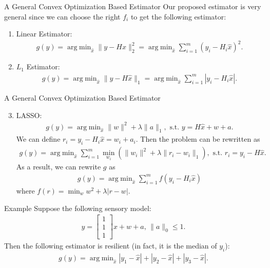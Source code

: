 \documentclass[10pt]{beamer}
\DeclareMathOperator{\argmin}{arg\;min}
\begin{document}
\begin{frame}{A General Convex Optimization Based Estimator}
  Our proposed estimator is very general since we can choose the right $f_i$ to get the following estimator:
  \begin{enumerate}
  \item Linear Estimator:
    \begin{align*}
      g(y) = \argmin_{\hat x} \|y-H\hat x\|_2^2= \argmin_{\hat x}  \sum_{i=1}^m (y_i-H_i\hat x)^2.
    \end{align*}
  \item $L_1$ Estimator:
    \begin{align*}
      g(y) = \argmin_{\hat x} \|y-H\hat x\|_1=\argmin_{\hat x} \sum_{i=1}^m |y_i-H_i\hat x|.
    \end{align*}
  \end{enumerate}
\end{frame}


\begin{frame}{A General Convex Optimization Based Estimator}
  \begin{enumerate}  \setcounter{enumi}{2}

  \item LASSO:
    \begin{align*}
      g(y) = \argmin_{\hat x} \|w\|^2+\lambda \|a\|_1, \text{ s.t. }y=H\hat x+w+a.
    \end{align*}
    We can define $r_i = y_i-H_i\hat x = w_i+a_i$. Then the problem can be rewritten as
    \begin{align*}
      g(y) = \argmin_{\hat x}\sum_{i=1}^m \min_{w_i}\left(\|w_i\|^2+\lambda \|r_i-w_i\|_1\right), \text{ s.t. }r_i=y_i-H\hat x.
    \end{align*}
    As a result, we can rewrite $g$ as
    \begin{align*}
      g(y) = \argmin_{\hat x} \sum_{i=1}^m f(y_i-H_i\hat x)
    \end{align*}
    where $f(r) = \min_{w} w^2 + \lambda |r-w|.$
  \end{enumerate}
\end{frame}

\begin{frame}{Example}
  Suppose the following sensory model:
  \begin{align*}
    y = \begin{bmatrix}
      1\\
      1\\
      1
    \end{bmatrix}x + w+a,\,\|a\|_0\leq 1.
  \end{align*}
  Then the following estimator is resilient (in fact, it is the median of $y_i$):
  \begin{align*}
    g(y) = \argmin_{\hat x}  |y_1-\hat x|+|y_2-\hat x|+|y_3-\hat x|.
  \end{align*}
\end{frame}
\end{document}
